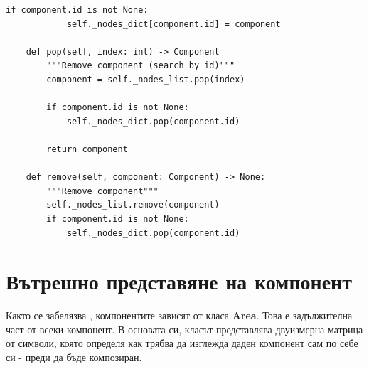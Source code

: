 \begin{lstlisting}[style=py]
        if component.id is not None:
            self._nodes_dict[component.id] = component

    def pop(self, index: int) -> Component
        """Remove component (search by id)"""
        component = self._nodes_list.pop(index)

        if component.id is not None:
            self._nodes_dict.pop(component.id)

        return component

    def remove(self, component: Component) -> None:
        """Remove component"""
        self._nodes_list.remove(component)
        if component.id is not None:
            self._nodes_dict.pop(component.id)
        \end{lstlisting}

\section{Вътрешно представяне на компонент}
        Както се забелязва , компонентите зависят
        от класа \textbf{Area}. Това е задължителна част от всеки компонент. В 
        основата си, класът представлява двуизмерна матрица от символи, която 
        определя как трябва да изглежда даден компонент сам по себе си - преди 
        да бъде композиран. 


